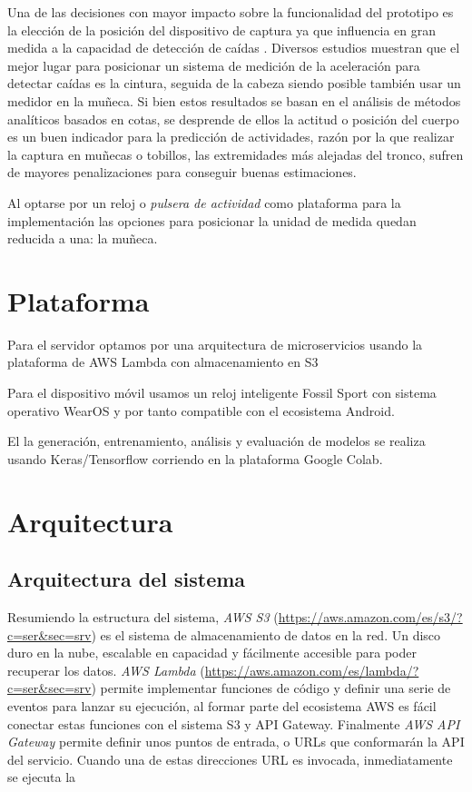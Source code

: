 Una de las decisiones con mayor impacto sobre la funcionalidad del prototipo es la elección de la posición del dispositivo de captura ya que influencia en gran medida a la capacidad de detección de caídas \cite{Kangas2008}. Diversos estudios muestran que el mejor lugar para posicionar un sistema de medición de la aceleración para detectar caídas es la cintura, seguida de la cabeza siendo posible también usar un medidor en la muñeca\cite{Chen2005, Kangas2008, Noury2007}. Si bien estos resultados se basan en el análisis de métodos analíticos basados en cotas, se desprende de ellos la actitud o posición del cuerpo es un buen indicador para la predicción de actividades, razón por la que realizar la captura en muñecas o tobillos, las extremidades más alejadas del tronco, sufren de mayores penalizaciones para conseguir buenas estimaciones.

Al optarse por un reloj o \textit{pulsera de actividad} como plataforma para la implementación las opciones para posicionar la unidad de medida quedan reducida a una: la muñeca.


\section{Plataforma}
Para el servidor optamos por una arquitectura de microservicios usando la plataforma de AWS Lambda con almacenamiento en S3

Para el dispositivo móvil usamos un reloj inteligente Fossil Sport con sistema operativo WearOS y por tanto compatible con el ecosistema Android.

El la generación, entrenamiento, análisis y evaluación de modelos se realiza usando Keras/Tensorflow corriendo en la plataforma Google Colab.

\section{Arquitectura}\label{desc_archi}

\subsection{Arquitectura del sistema}

Resumiendo la estructura del sistema, \textit{AWS S3} (\url{https://aws.amazon.com/es/s3/?c=ser&sec=srv}) es el sistema de almacenamiento de datos en la red. Un disco duro en la nube, escalable en capacidad y fácilmente accesible para poder recuperar los datos. \textit{AWS Lambda} (\url{https://aws.amazon.com/es/lambda/?c=ser&sec=srv}) permite implementar funciones de código y definir una serie de eventos para lanzar su ejecución, al formar parte del ecosistema AWS es fácil conectar estas funciones con el sistema S3 y API Gateway. Finalmente \textit{AWS API Gateway} permite definir unos puntos de entrada, o URLs que conformarán la API del servicio. Cuando una de estas direcciones URL es invocada, inmediatamente se ejecuta la 

